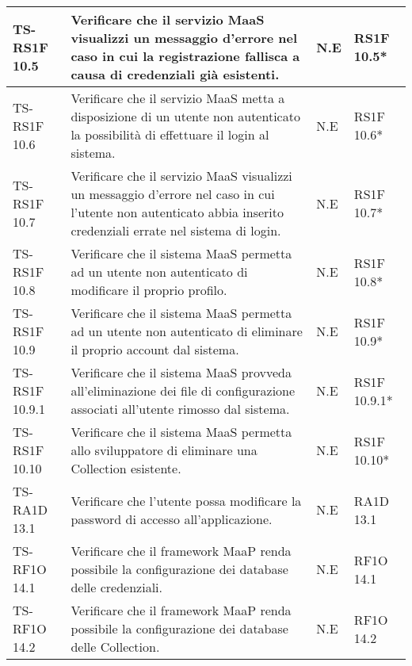 \begin{center}
\begin{longtable}{| p{3cm} | p{6cm} | p{1.5cm} | p{2cm} | }
				TS-RS1F 10.5 & 
				Verificare che il servizio MaaS visualizzi un messaggio d’errore nel caso in cui la registrazione fallisca a causa di credenziali già esistenti. & N.E & RS1F 10.5*  \newline  \\ \hline 
				TS-RS1F 10.6 & 
				Verificare che il servizio MaaS metta a disposizione di un utente non autenticato la possibilità di effettuare il login al sistema. & N.E & RS1F 10.6*  \newline  \\ \hline 
				TS-RS1F 10.7 & 
				Verificare che il servizio MaaS visualizzi un messaggio d’errore nel caso in cui l’utente non autenticato abbia inserito credenziali errate nel sistema di login. & N.E & RS1F 10.7*  \newline  \\ \hline 
				TS-RS1F 10.8 & 
				Verificare che il sistema MaaS permetta ad un utente non autenticato di modificare il proprio profilo. & N.E & RS1F 10.8*  \newline  \\ \hline 
				TS-RS1F 10.9 & 
				Verificare che il sistema MaaS permetta ad un utente non autenticato di eliminare il proprio account dal sistema. & N.E & RS1F 10.9*  \newline  \\ \hline 
				TS-RS1F 10.9.1 & 
				Verificare che il sistema MaaS provveda all'eliminazione dei file di configurazione associati all'utente rimosso dal sistema. & N.E & RS1F 10.9.1*  \newline  \\ \hline 
				TS-RS1F 10.10 & 
				Verificare che il sistema MaaS permetta allo sviluppatore di eliminare una Collection esistente. & N.E & RS1F 10.10*  \newline  \\ \hline 
				TS-RA1D 13.1 & 
				Verificare che l’utente possa modificare la password di accesso all'applicazione. & N.E & RA1D 13.1 \newline  \\ \hline 
				TS-RF1O 14.1 & 
				Verificare che il framework MaaP renda possibile la configurazione dei database delle credenziali. & N.E & RF1O 14.1 \newline  \\ \hline 
				TS-RF1O 14.2 & 
				Verificare che il framework MaaP renda possibile la configurazione dei database delle Collection. & N.E & RF1O 14.2 \newline  \\ \hline 

\end{longtable}
\end{center}
